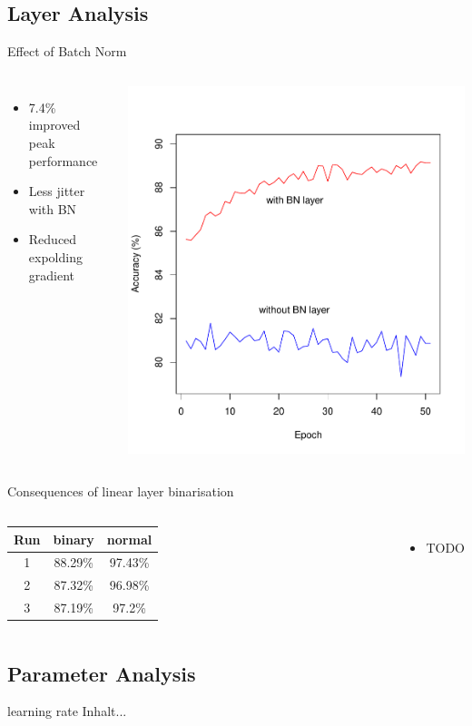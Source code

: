 \documentclass[aspectratio=1610, 12pt]{beamer}
\begin{document}
\subsection{Layer Analysis}
\begin{frame}{Effect of Batch Norm}
 	\begin{columns}
 		\begin{itemize}
 			\item 7.4\% improved peak performance
 			\item Less jitter with BN
 			\item Reduced expolding gradient
 		\end{itemize}
 		
 		\centering
 		\includegraphics[scale=0.45]{images/batchnorm_measurement.pdf}
 	\end{columns}
\end{frame}
\begin{frame}{Consequences of linear layer binarisation}


\begin{columns}
	\column{0.49\textwidth}
	\centering
		\begin{tabular}{|c|c|c|}\hline
		Run&binary&normal\\\hline
		1&88.29\%&97.43\%\\\hline
		2&87.32\%&96.98\%\\\hline
		3&87.19\%&97.2\%\\\hline
	\end{tabular}	
	\column{0.49\textwidth}
	\begin{itemize}
		\item TODO
	\end{itemize}
	
\end{columns}


\end{frame}

\subsection{Parameter Analysis}
\begin{frame}{learning rate}
Inhalt...
\end{frame}
\end{document}
